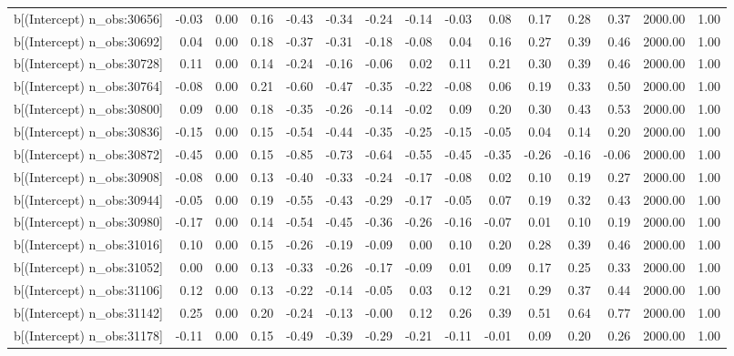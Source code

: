 \begin{table}[ht]
\begin{tabular}{rrrrrrrrrrrrrrr}
  b[(Intercept) n\_obs:30656] & -0.03 & 0.00 & 0.16 & -0.43 & -0.34 & -0.24 & -0.14 & -0.03 & 0.08 & 0.17 & 0.28 & 0.37 & 2000.00 & 1.00 \\ 
  b[(Intercept) n\_obs:30692] & 0.04 & 0.00 & 0.18 & -0.37 & -0.31 & -0.18 & -0.08 & 0.04 & 0.16 & 0.27 & 0.39 & 0.46 & 2000.00 & 1.00 \\ 
  b[(Intercept) n\_obs:30728] & 0.11 & 0.00 & 0.14 & -0.24 & -0.16 & -0.06 & 0.02 & 0.11 & 0.21 & 0.30 & 0.39 & 0.46 & 2000.00 & 1.00 \\ 
  b[(Intercept) n\_obs:30764] & -0.08 & 0.00 & 0.21 & -0.60 & -0.47 & -0.35 & -0.22 & -0.08 & 0.06 & 0.19 & 0.33 & 0.50 & 2000.00 & 1.00 \\ 
  b[(Intercept) n\_obs:30800] & 0.09 & 0.00 & 0.18 & -0.35 & -0.26 & -0.14 & -0.02 & 0.09 & 0.20 & 0.30 & 0.43 & 0.53 & 2000.00 & 1.00 \\ 
  b[(Intercept) n\_obs:30836] & -0.15 & 0.00 & 0.15 & -0.54 & -0.44 & -0.35 & -0.25 & -0.15 & -0.05 & 0.04 & 0.14 & 0.20 & 2000.00 & 1.00 \\ 
  b[(Intercept) n\_obs:30872] & -0.45 & 0.00 & 0.15 & -0.85 & -0.73 & -0.64 & -0.55 & -0.45 & -0.35 & -0.26 & -0.16 & -0.06 & 2000.00 & 1.00 \\ 
  b[(Intercept) n\_obs:30908] & -0.08 & 0.00 & 0.13 & -0.40 & -0.33 & -0.24 & -0.17 & -0.08 & 0.02 & 0.10 & 0.19 & 0.27 & 2000.00 & 1.00 \\ 
  b[(Intercept) n\_obs:30944] & -0.05 & 0.00 & 0.19 & -0.55 & -0.43 & -0.29 & -0.17 & -0.05 & 0.07 & 0.19 & 0.32 & 0.43 & 2000.00 & 1.00 \\ 
  b[(Intercept) n\_obs:30980] & -0.17 & 0.00 & 0.14 & -0.54 & -0.45 & -0.36 & -0.26 & -0.16 & -0.07 & 0.01 & 0.10 & 0.19 & 2000.00 & 1.00 \\ 
  b[(Intercept) n\_obs:31016] & 0.10 & 0.00 & 0.15 & -0.26 & -0.19 & -0.09 & 0.00 & 0.10 & 0.20 & 0.28 & 0.39 & 0.46 & 2000.00 & 1.00 \\ 
  b[(Intercept) n\_obs:31052] & 0.00 & 0.00 & 0.13 & -0.33 & -0.26 & -0.17 & -0.09 & 0.01 & 0.09 & 0.17 & 0.25 & 0.33 & 2000.00 & 1.00 \\ 
  b[(Intercept) n\_obs:31106] & 0.12 & 0.00 & 0.13 & -0.22 & -0.14 & -0.05 & 0.03 & 0.12 & 0.21 & 0.29 & 0.37 & 0.44 & 2000.00 & 1.00 \\ 
  b[(Intercept) n\_obs:31142] & 0.25 & 0.00 & 0.20 & -0.24 & -0.13 & -0.00 & 0.12 & 0.26 & 0.39 & 0.51 & 0.64 & 0.77 & 2000.00 & 1.00 \\ 
  b[(Intercept) n\_obs:31178] & -0.11 & 0.00 & 0.15 & -0.49 & -0.39 & -0.29 & -0.21 & -0.11 & -0.01 & 0.09 & 0.20 & 0.26 & 2000.00 & 1.00 \\ 

\end{tabular}
\end{table}
